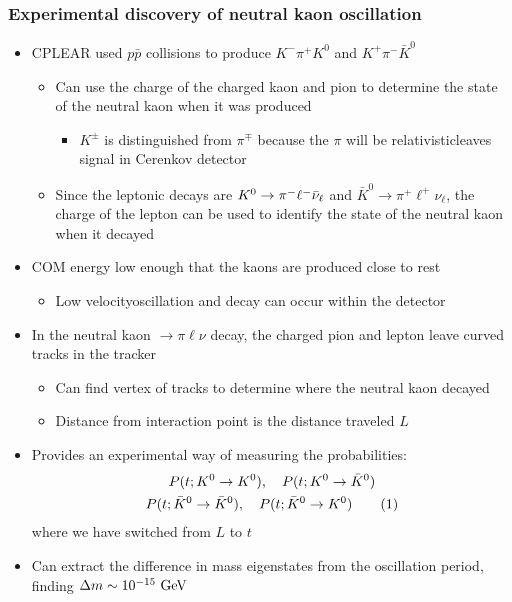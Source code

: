\subsubsection{Experimental discovery of neutral kaon oscillation}
\begin{itemize}
  \item CPLEAR used $p\bar p$ collisions to produce $K^- \pi^+ K^0$ and $K^+ \pi^- \bar K^0$
  \begin{itemize}
    \item Can use the charge of the charged kaon and pion to determine the state of the neutral kaon when it was produced
    \begin{itemize}
      \item $K^\pm$ is distinguished from $\pi^\mp$ because the $\pi$ will be relativistic\thus leaves signal in Cerenkov detector
    \end{itemize}
    \item Since the leptonic decays are $K^0 \rightarrow \pi^- \ell^-{\bar{\nu}}_\ell $ and $\bar K^0 \rightarrow \pi^+ \ell^+ \nu_\ell$, the charge of the lepton can be used to identify the state of the neutral kaon when it decayed
  \end{itemize}
  \item COM energy low enough that the kaons are produced close to rest 
  \begin{itemize}
    \item Low velocity\thus oscillation and decay can occur within the detector
  \end{itemize}
  \item In the neutral kaon $\rightarrow \pi \ell \nu$ decay, the charged pion and lepton leave curved tracks in the tracker
  \begin{itemize}
    \item Can find vertex of tracks to determine where the neutral kaon decayed
    \item Distance from interaction point is the distance traveled $L$
  \end{itemize}
  \item Provides an experimental way of measuring the probabilities:
  \begin{gather*}
    P(t; K^0\rightarrow K^0), \quad P(t; K^0\rightarrow \bar K^0)\\
    P(t; \bar K^0\rightarrow \bar K^0), \quad P(t; \bar K^0\rightarrow K^0)\numberthis
  \end{gather*}
  where we have switched from $L$ to $t$
  \item Can extract the difference in mass eigenstates from the oscillation period, finding $\Delta m \sim 10^{-15}~\text{GeV}$
\end{itemize}

